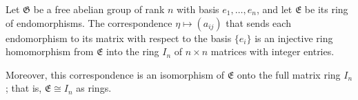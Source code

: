 Let $\mathfrak{G}$ be a free abelian group of rank $n$ with basis $e_1, \ldots, e_n$, and let $\mathfrak{E}$ be its ring of endomorphisms. The correspondence $\eta \mapsto (a_{ij})$ that sends each endomorphism to its matrix with respect to the basis $\{e_i\}$ is an injective ring homomorphism from $\mathfrak{E}$ into the ring $I_n$ of $n \times n$ matrices with integer entries.

Moreover, this correspondence is an isomorphism of $\mathfrak{E}$ onto the full matrix ring $I_n$; that is, $\mathfrak{E} \cong I_n$ as rings.
